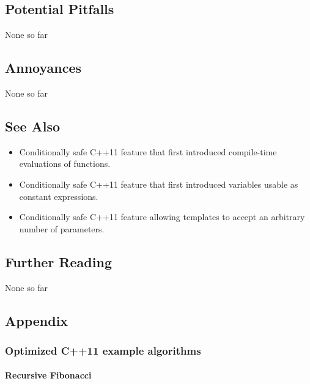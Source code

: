 \subsection[Potential Pitfalls]{Potential Pitfalls}\label{potential-pitfalls}

None so far

\subsection[Annoyances]{Annoyances}\label{annoyances}

None so far

\subsection[See Also]{See Also}\label{see-also}

\begin{itemize}
\item{Conditionally safe C++11 feature that first introduced compile-time evaluations of functions.}
\item{Conditionally safe C++11 feature that first introduced variables usable as constant expressions.}
\item{Conditionally safe C++11 feature allowing templates to accept an arbitrary number of parameters.}
\end{itemize}

\subsection[Further Reading]{Further Reading}\label{further-reading}

None so far

\subsection[Appendix]{Appendix}\label{appendix-relaxedconstexpr}

\subsubsection[Optimized C++11 example algorithms]{Optimized C++11 example algorithms}\label{appendix:-optimized-c++11-example-algorithms}

\paragraph[Recursive Fibonacci]{Recursive Fibonacci}\label{recursive-fibonacci}

